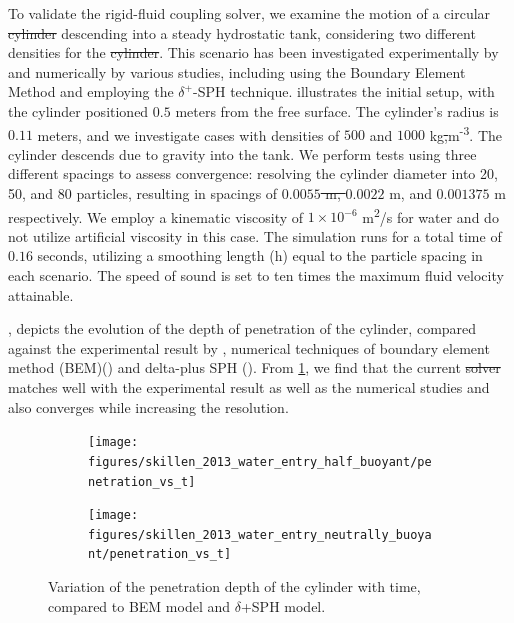 \documentclass[preprint,12pt]{elsarticle}
\providecommand{\DIFaddtex}[1]{{\protect\color{blue}\uwave{#1}}} %
\providecommand{\DIFdeltex}[1]{{\protect\color{red}\sout{#1}}}                      %
\providecommand{\DIFaddbegin}{} %
\providecommand{\DIFaddend}{} %
\providecommand{\DIFdelbegin}{} %
\providecommand{\DIFdelend}{} %
\providecommand{\DIFadd}[1]{\texorpdfstring{\DIFaddtex{#1}}{#1}} %
\providecommand{\DIFdel}[1]{\texorpdfstring{\DIFdeltex{#1}}{}} %
\newcommand{\DIFscaledelfig}{0.5}
\newlength{\DIFdelgraphicswidth} %
\newlength{\DIFdelgraphicsheight} %
\newcommand{\DIFaddincludegraphics}[2][]{{\color{blue}\fbox{\DIFOincludegraphics[#1]{#2}}}} %
\newcommand{\DIFdelincludegraphics}[2][]{%
\sbox{\DIFdelgraphicsbox}{\DIFOincludegraphics[#1]{#2}}%
\settoboxwidth{\DIFdelgraphicswidth}{\DIFdelgraphicsbox} %
\settoboxtotalheight{\DIFdelgraphicsheight}{\DIFdelgraphicsbox} %
\scalebox{\DIFscaledelfig}{%
\parbox[b]{\DIFdelgraphicswidth}{\usebox{\DIFdelgraphicsbox}\\[-\baselineskip] \rule{\DIFdelgraphicswidth}{0em}}\llap{\resizebox{\DIFdelgraphicswidth}{\DIFdelgraphicsheight}{%
\setlength{\unitlength}{\DIFdelgraphicswidth}%
\begin{picture}(1,1)%
\thicklines\linethickness{2pt} %
{\color[rgb]{1,0,0}\put(0,0){\framebox(1,1){}}}%
{\color[rgb]{1,0,0}\put(0,0){\line( 1,1){1}}}%
{\color[rgb]{1,0,0}\put(0,1){\line(1,-1){1}}}%
\end{picture}%
}\hspace*{3pt}}} %
} %
\DeclareRobustCommand{\DIFaddbegin}{\DIFOaddbegin \let\includegraphics\DIFaddincludegraphics} %
\DeclareRobustCommand{\DIFaddend}{\DIFOaddend \let\includegraphics\DIFOincludegraphics} %
\DeclareRobustCommand{\DIFdelbegin}{\DIFOdelbegin \let\includegraphics\DIFdelincludegraphics} %
\DeclareRobustCommand{\DIFdelend}{\DIFOaddend \let\includegraphics\DIFOincludegraphics} %
\begin{document}
To validate the rigid-fluid coupling solver, we examine the motion of a
circular \DIFdelbegin \DIFdel{cylinder }\DIFdelend \DIFaddbegin \DIFadd{disc }\DIFaddend descending into a steady hydrostatic tank, considering two
different densities for the \DIFdelbegin \DIFdel{cylinder}\DIFdelend \DIFaddbegin \DIFadd{disc}\DIFaddend . This scenario has been investigated
experimentally by
\citet{greenhow1983nonlinear} and
numerically by various studies, including
\citet{sun2006water} using the Boundary Element Method
and \cite{sun2018accurate} employing the $\delta^+$-SPH technique.
illustrates the initial setup, with the cylinder positioned $0.5$ meters from
the free surface. The cylinder's radius is $0.11$ meters, and we investigate
cases with densities of $500$ and $1000$ kg\DIFdelbegin \DIFdel{,}\DIFdelend \DIFaddbegin \DIFadd{\,}\DIFaddend m\textsuperscript{-3}.
The cylinder descends due to gravity into the tank. We perform tests using
three different spacings to assess convergence: resolving the cylinder
diameter into 20, 50, and 80 particles, resulting in spacings of \DIFdelbegin \DIFdel{$0.0055$ m,
$0.0022$ }\DIFdelend \DIFaddbegin \DIFadd{$5.5 \times 10^{-3}$ m,
$2.2 \times 10^{-3}$ }\DIFaddend m, and \DIFdelbegin \DIFdel{$0.001375$ }\DIFdelend \DIFaddbegin \DIFadd{$1.375 \times 10^{-3}$ }\DIFaddend m respectively. We employ a kinematic viscosity of
$1 \times 10^{-6}$ m\textsuperscript{2}/s for water and do not utilize artificial
viscosity in this case. The simulation runs for a total time of $0.16$
seconds, utilizing a smoothing length (h) equal to the particle spacing in
each scenario. The speed of sound is set to ten times the maximum fluid
velocity attainable.


, depicts the evolution of the
depth of penetration of the cylinder, compared against the experimental result
by \citet{greenhow1983nonlinear}, numerical techniques of boundary element
method (BEM)(\cite{sun2006water}) and delta-plus SPH
(\cite{sun2018accurate}). From \cref{fig:result_rfc_01_result_displacement},
we find that the current \DIFdelbegin \DIFdel{solver }\DIFdelend \DIFaddbegin \DIFadd{numerical results }\DIFaddend matches well with the experimental result as
well as the numerical studies and also converges while increasing the
resolution.
\begin{figure}[!htpb]
  \centering
  \begin{subfigure}{0.48\textwidth}
    \centering
    \texttt{[image: figures/skillen\_2013\_water\_entry\_half\_buoyant/penetration\_vs\_t]}
  \end{subfigure}
  \begin{subfigure}{0.48\textwidth}
    \centering
    \texttt{[image: figures/skillen\_2013\_water\_entry\_neutrally\_buoyant/penetration\_vs\_t]}
  \end{subfigure}
  \caption{Variation of the penetration depth of the cylinder with time,
    compared to BEM model \cite{sun2006water} and $\delta$+SPH model\cite{sun2018accurate}.}
\label{fig:result_rfc_01_result_displacement}
\end{figure}
\end{document}
